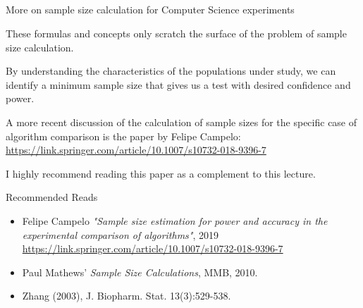 \subsection{}
\begin{frame}{More on sample size calculation for Computer Science experiments}

  These formulas and concepts only scratch the surface of the problem of sample size calculation. \bigskip

  By understanding the characteristics of the populations under study, we can identify a minimum sample size that gives us a test with desired confidence and power.\bigskip

  A more recent discussion of the calculation of sample sizes for the specific case of algorithm comparison is the paper by Felipe Campelo:\\
  \url{https://link.springer.com/article/10.1007/s10732-018-9396-7}\bigskip

  I highly recommend reading this paper as a complement to this lecture.
\end{frame}

\begin{frame}{Recommended Reads}
  \begin{itemize}
    \item Felipe Campelo \emph{"Sample size estimation for power and accuracy in the experimental comparison of algorithms"}, 2019
    \url{https://link.springer.com/article/10.1007/s10732-018-9396-7}
    \item Paul Mathews' \textit{Sample Size Calculations}, MMB, 2010.
    \item Zhang (2003), J. Biopharm. Stat. 13(3):529-538.
  \end{itemize}
\end{frame}

